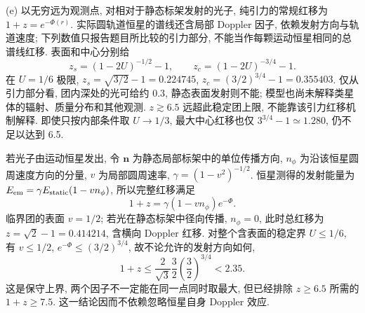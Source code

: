 \begin{solution}
(e) 以无穷远为观测点, 对相对于静态标架发射的光子, 纯引力的常规红移为 $1+z=e^{-\Phi(r)}$. 实际圆轨道恒星的谱线还含局部 Doppler 因子, 依赖发射方向与轨道速度; 下列数值只报告题目所比较的引力部分, 不能当作每颗运动恒星相同的总谱线红移. 表面和中心分别给
\[
z_s=(1-2U)^{-1/2}-1,\qquad z_c=(1-2U)^{-3/4}-1.
\]
在 $U=1/6$ 极限, $z_s=\sqrt{3/2}-1=0.224745$, $z_c=(3/2)^{3/4}-1=0.355403$. 仅从引力部分看, 团内深处的光可给约 $0.3$, 静态表面发射则不能; 模型也尚未解释类星体的辐射、质量分布和其他观测. $z\gtrsim6.5$ 远超此稳定团上限, 不能靠该引力红移机制解释. 即使只按内部条件取 $U\to1/3$, 最大中心红移也仅 $3^{3/4}-1\simeq1.280$, 仍不足以达到 6.5.

若光子由运动恒星发出, 令 $\boldsymbol n$ 为静态局部标架中的单位传播方向, $n_\phi$ 为沿该恒星圆周速度方向的分量, $v$ 为局部圆周速率, $\gamma=(1-v^2)^{-1/2}$. 恒星测得的发射能量为 $E_{\rm em}=\gamma E_{\rm static}(1-vn_\phi)$, 所以完整红移满足
\[
1+z=\gamma(1-vn_\phi)e^{-\Phi}.
\]
临界团的表面 $v=1/2$; 若光在静态标架中径向传播, $n_\phi=0$, 此时总红移为 $z=\sqrt2-1=0.414214$, 含横向 Doppler 红移. 对整个含表面的稳定界 $U\le1/6$, 有 $v\le1/2$, $e^{-\Phi}\le(3/2)^{3/4}$, 故不论允许的发射方向如何,
\[
1+z\le\frac2{\sqrt3}\frac32\left(\frac32\right)^{3/4}<2.35.
\]
这是保守上界, 两个因子不一定能在同一点同时取最大, 但已经排除 $z\ge6.5$ 所需的 $1+z\ge7.5$. 这一结论因而不依赖忽略恒星自身 Doppler 效应.

\end{solution}

